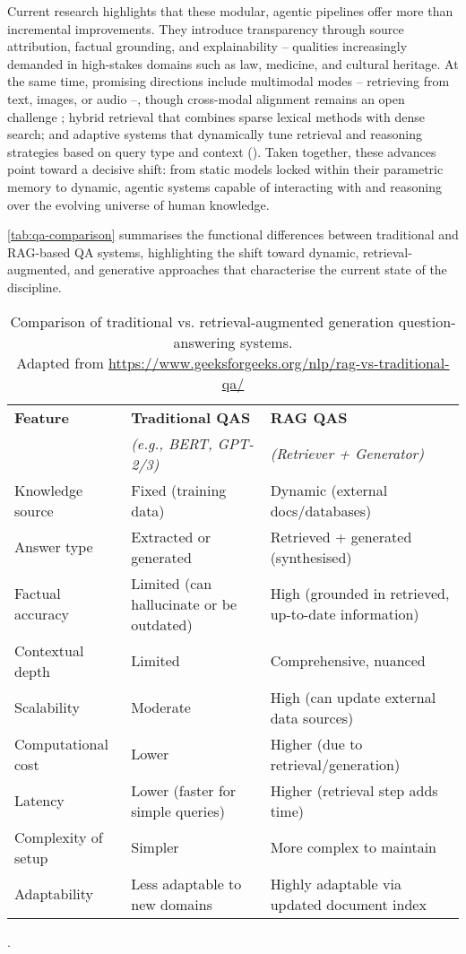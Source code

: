 \begin{spacing}{1.5}
Current research highlights that these modular, agentic pipelines offer more than incremental improvements. They introduce transparency through source attribution, factual grounding, and explainability -- qualities increasingly demanded in high-stakes domains such as law, medicine, and cultural heritage. At the same time, promising directions include multimodal modes -- retrieving from text, images, or audio --, though cross-modal alignment remains an open challenge \citep{vaibhav_retrieval-augmented_2025}; hybrid retrieval that combines sparse lexical methods with dense search; and adaptive systems that dynamically tune retrieval and reasoning strategies based on query type and context (\cite{yue_survey_2025,vaibhav_retrieval-augmented_2025}). Taken together, these advances point toward a decisive shift: from static models locked within their parametric memory to dynamic, agentic systems capable of interacting with and reasoning over the evolving universe of human knowledge.

\autoref{tab:qa-comparison} summarises the functional differences between traditional and RAG-based QA systems, highlighting the shift toward dynamic, retrieval-augmented, and generative approaches that characterise the current state of the discipline. 

\addtocounter{table}{-1}
\begin{table}[H]
\centering
\begin{tabularx}{\textwidth}{l>{\raggedright\arraybackslash}X>{\raggedright\arraybackslash}X}
\toprule
\textbf{Feature} & \textbf{Traditional QAS} & \textbf{RAG QAS} \\
& \textit{(e.g., BERT, GPT-2/3)} & \textit{(Retriever + Generator)} \\
\midrule
Knowledge source & Fixed (training data) & Dynamic (external docs/databases) \\
Answer type & Extracted or generated & Retrieved + generated (synthesised) \\
Factual accuracy & Limited (can hallucinate or be outdated) & High (grounded in retrieved, up-to-date information) \\
Contextual depth & Limited & Comprehensive, nuanced \\
Scalability & Moderate & High (can update external data sources) \\
Computational cost & Lower & Higher (due to retrieval/generation) \\
Latency & Lower (faster for simple queries) & Higher (retrieval step adds time) \\
Complexity of setup & Simpler & More complex to maintain \\
Adaptability & Less adaptable to new domains & Highly adaptable via updated document index \\
\bottomrule
\end{tabularx}
\vspace{0.5em}
\caption{Comparison of traditional vs. retrieval-augmented generation question-answering systems.\\ \footnotesize{Adapted from \url{https://www.geeksforgeeks.org/nlp/rag-vs-traditional-qa/}\nocite{noauthor_rag_2025}}}.
\label{tab:qa-comparison}
\end{table}



\end{spacing}
